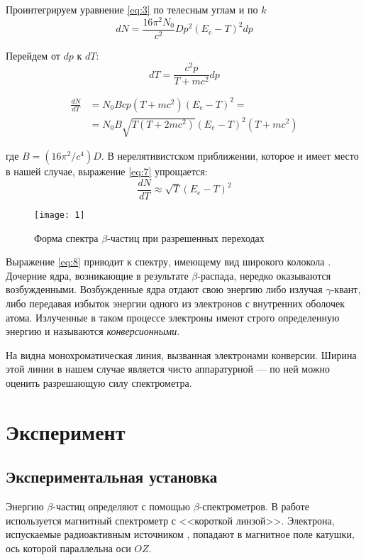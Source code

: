 \documentclass[a4paper, 12pt]{article}
\begin{document}
Проинтегрируем уравнение \eqref{eq:3} по телесным углам и по $k$
\begin{equation}
    d N = \frac{16 \pi^2 N_0}{c^2} D p^2 (E_e - T)^2 dp
    \label{eq:5}
\end{equation}

Перейдем от $dp$ к $dT$:
\begin{equation}
    dT = \frac{c^2 p}{T + mc^2}dp
    \label{eq:6}
\end{equation}


\begin{equation}
    \begin{aligned}
        \frac{dN}{dT} &= N_0 B cp (T + mc^2) (E_e - T)^2 = 
        \\ &= N_0 B \sqrt{T (T + 2mc^2)} (E_e - T)^2 (T + mc^2) 
    \end{aligned}
    \label{eq:7}
\end{equation}


\noindent где $B = (16 \pi^2 / c^4)D$. В нерелятивистском приближении, которое и
имеет место в нашей случае, выражение \eqref{eq:7} упрощается:
\begin{equation}
    \frac{dN}{dT} \approx \sqrt{T} (E_e - T)^2
    \label{eq:8}
\end{equation}

\begin{wrapfigure}{l}{0.33\linewidth}
    \vspace{-3em}
    \texttt{[image: 1]}
    \caption{Форма спектра $\beta$-частиц при разрешенных переходах}
    \label{fig:1}
\end{wrapfigure}

Выражение \eqref{eq:8} приводит к спектру, имеющему вид широкого
колокола . Дочерние ядра, возникающие в результате
$\beta$-распада, нередко оказываются возбужденными. Возбужденные ядра
отдают свою энергию либо излучая $\gamma$-квант, либо передавая
избыток энергии одного из электронов с внутренних оболочек атома.
Излученные в таком процессе электроны имеют строго определенную
энергию и называются \emph{конверсионными}.

На  видна монохроматическая линия, вызванная электронами
конверсии.  Ширина этой линии в нашем случае является чисто
аппаратурной --- по ней можно оценить разрешающую силу спектрометра.


\section{Эксперимент}
\subsection{Экспериментальная установка}
Энергию $\beta$-частиц определяют с помощью $\beta$-спектрометров. В
работе используется магнитный спектрометр с <<короткой линзой>>.
Электрона, испускаемые радиоактивным источником , попадают
в магнитное поле катушки, ось которой параллельна оси $OZ$.
\end{document}
